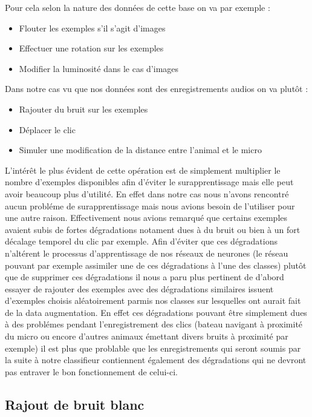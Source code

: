 Pour cela selon la nature des données de cette base on va par exemple :
\begin{itemize}
\item Flouter les exemples s'il s'agit d'images
\item Effectuer une rotation sur les exemples
\item Modifier la luminosité dans le cas d'images
\end{itemize}

Dans notre cas vu que nos données sont des enregistrements audios on va plutôt :
\begin{itemize}
\item Rajouter du bruit sur les exemples
\item Déplacer le clic
\item Simuler une modification de la distance entre l'animal et le micro
\end{itemize}

L'intérêt le plus évident de cette opération est de simplement multiplier le nombre d'exemples disponibles afin d'éviter le surapprentissage mais elle peut avoir beaucoup plus d'utilité. En effet dans notre cas nous n'avons rencontré aucun probléme de surapprentissage mais nous avions besoin de l'utiliser pour une autre raison.
Effectivement nous avions remarqué que certains exemples avaient subis de fortes dégradations notament dues à du bruit ou bien à un fort décalage temporel du clic par exemple. Afin d'éviter que ces dégradations n'altérent le processus d'apprentissage de nos réseaux de neurones (le réseau pouvant par exemple assimiler une de ces dégradations à l'une des classes) plutôt que de supprimer ces dégradations il nous a paru plus pertinent de d'abord essayer de rajouter des exemples avec des dégradations similaires issuent d'exemples choisis aléatoirement parmis nos classes sur lesquelles ont aurait fait de la data augmentation. En effet ces dégradations pouvant être simplement dues à des problémes pendant l'enregistrement des clics (bateau navigant à proximité du micro ou encore d'autres animaux émettant divers bruits à proximité par exemple) il est plus que problable que les enregistrements qui seront soumis par la suite à notre classifieur contiennent également des dégradations qui ne devront pas entraver le bon fonctionnement de celui-ci.

\hypertarget{Rajout-de-bruit-blanc}{%
\subsection{Rajout de bruit blanc}
\label{Rajout-de-bruit-blanc}}

